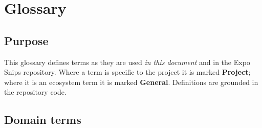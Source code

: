 \chapter{Glossary}
\label{ch:glossary}

\section{Purpose}

This glossary defines terms as they are used \emph{in this document} and in the
Expo Snips repository. Where a term is specific to the project it is marked
\textbf{Project}; where it is an ecosystem term it is marked \textbf{General}.
Definitions are grounded in the repository code.

\section{Domain terms}

